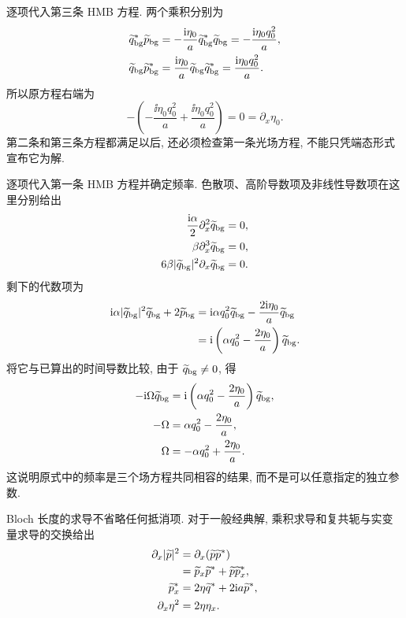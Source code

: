 \par\smallskip\noindent 逐项代入第三条 HMB 方程.\quad
两个乘积分别为
\begin{align*}
{\widetilde q_{\rm bg}}^{*}\widetilde p_{\rm bg}
&=-\dfrac{\mathrm{i}\eta_0}{a}
{\widetilde q_{\rm bg}}^{*}\widetilde q_{\rm bg}
=-\dfrac{\mathrm{i}\eta_0q_0^2}{a},\\
\widetilde q_{\rm bg}{\widetilde p_{\rm bg}}^{*}
&=\dfrac{\mathrm{i}\eta_0}{a}
\widetilde q_{\rm bg}{\widetilde q_{\rm bg}}^{*}
=\dfrac{\mathrm{i}\eta_0q_0^2}{a}.
\end{align*}
所以原方程右端为
\begin{equation*}
-\left(-\dfrac{\ii\eta_0q_0^2}{a}
+\dfrac{\ii\eta_0q_0^2}{a}\right)=0
=\partial_x\eta_0.
\end{equation*}
第二条和第三条方程都满足以后, 还必须检查第一条光场方程, 不能只凭端态形式宣布它为解.
\par\smallskip\noindent 逐项代入第一条 HMB 方程并确定频率.\quad
色散项、高阶导数项及非线性导数项在这里分别给出
\begin{align*}
\dfrac{\mathrm{i}\alpha}{2}\partial_x^2\widetilde q_{\rm bg}&=0,\\
\beta\partial_x^3\widetilde q_{\rm bg}&=0,\\
6\beta|\widetilde q_{\rm bg}|^2
\partial_x\widetilde q_{\rm bg}&=0.
\end{align*}
剩下的代数项为
\begin{align*}
\mathrm{i}\alpha|\widetilde q_{\rm bg}|^2\widetilde q_{\rm bg}
+2\widetilde p_{\rm bg}
&=\mathrm{i}\alpha q_0^2\widetilde q_{\rm bg}
-\dfrac{2\mathrm{i}\eta_0}{a}\widetilde q_{\rm bg}\\
&=\mathrm{i}\left(\alpha q_0^2-\dfrac{2\eta_0}{a}\right)
\widetilde q_{\rm bg}.
\end{align*}
将它与已算出的时间导数比较, 由于 $\widetilde q_{\rm bg}\ne0$, 得
\begin{align*}
-\mathrm{i}\Omega\widetilde q_{\rm bg}
&=\mathrm{i}\left(\alpha q_0^2-\dfrac{2\eta_0}{a}\right)
\widetilde q_{\rm bg},\\
-\Omega&=\alpha q_0^2-\dfrac{2\eta_0}{a},\\
\Omega&=-\alpha q_0^2+\dfrac{2\eta_0}{a}.
\end{align*}
这说明原式中的频率是三个场方程共同相容的结果, 而不是可以任意指定的独立参数.
\par\smallskip\noindent Bloch 长度的求导不省略任何抵消项.\quad
对于一般经典解, 乘积求导和复共轭与实变量求导的交换给出
\begin{align*}
\partial_x|\widetilde p|^2
&=\partial_x(\widetilde p{\widetilde p}^{*})\\
&=\widetilde p_x{\widetilde p}^{*}
+\widetilde p{\widetilde p_x}^{*},\\
{\widetilde p_x}^{*}
&=2\eta{\widetilde q}^{*}
+2\mathrm{i} a{\widetilde p}^{*},\\
\partial_x\eta^2&=2\eta\eta_x.
\end{align*}
